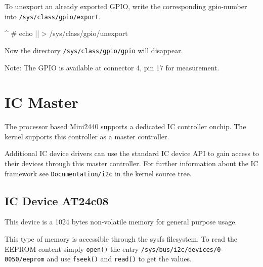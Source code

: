 To unexport an already exported GPIO, write the corresponding gpio-number into
\texttt{/sys/class/gpio/export}.

\begin{ptxshell}[escapechar=|]{^}
# echo |\perGpioNumber | > /sys/class/gpio/unexport
\end{ptxshell}

Now the directory \texttt{/sys/class/gpio/gpio\perGpioNumber} will disappear.

Note: The GPIO\perGpioNumber{} is available at connector 4, pin 17 for
measurement.


\section{I\texttwosuperior C Master}			\label{sec:I2C}

The \perCpuName{} processor based Mini2440 supports a dedicated
I\texttwosuperior C controller onchip. The kernel supports this controller as a
master controller.

Additional I\texttwosuperior C device drivers can use the standard
I\texttwosuperior C device API to gain access to their devices through this
master controller.
For further information about the I\texttwosuperior C framework see
\texttt{Documentation/i2c} in the kernel source tree.


\newcommand{\perEepromName}{AT24c08}
\newcommand{\perEepromSize}{1024 bytes}
\newcommand{\perEepromPath}{0-0050}

\subsection{I\texttwosuperior C Device \perEepromName {}}	\label{sec:EEPROM}

This device is a \perEepromSize{} non-volatile memory for general purpose usage.

This type of memory is accessible through the sysfs filesystem. To read the
EEPROM content simply \texttt{open()} the entry
\texttt{/sys/bus/i2c/devices/\perEepromPath{}/eeprom} and use
\texttt{fseek()} and \texttt{read()} to get the values.


